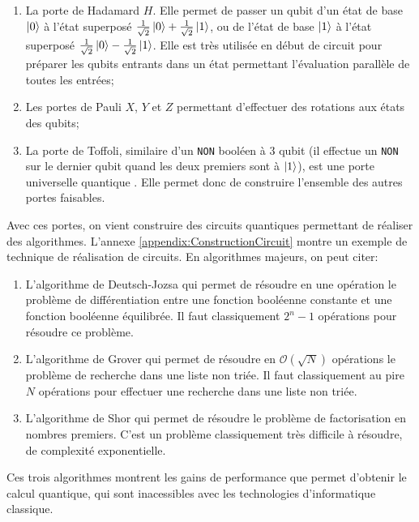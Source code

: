 \begin{enumerate}
    \item La porte de Hadamard $H$. Elle permet de passer un qubit d'un état de base $\ket{0}$ à l'état superposé $\frac{1}{\sqrt{2}}\ket{0} + \frac{1}{\sqrt{2}}\ket{1}$, ou de l'état de base $\ket{1}$ à l'état superposé $\frac{1}{\sqrt{2}}\ket{0} - \frac{1}{\sqrt{2}}\ket{1}$. Elle est très utilisée en début de circuit pour préparer les qubits entrants dans un état permettant l'évaluation parallèle de toutes les entrées;
    \item Les portes de Pauli $X$, $Y$ et $Z$ permettant d'effectuer des rotations aux états des qubits;
    \item La porte de Toffoli, similaire d'un \texttt{NON} booléen à 3 qubit (il effectue un \texttt{NON} sur le dernier qubit quand les deux premiers sont à $\ket{1}$), est une porte universelle quantique \cite{shi2002toffoli}. Elle permet donc de construire l'ensemble des autres portes faisables.
\end{enumerate}

Avec ces portes, on vient construire des circuits quantiques permettant de réaliser des algorithmes. L'annexe \ref{appendix:ConstructionCircuit} montre un exemple de technique de réalisation de circuits. En algorithmes majeurs, on peut citer:

\begin{enumerate}
    \item L'algorithme de Deutsch-Jozsa \cite{Deutsch92} qui permet de résoudre en une opération le problème de différentiation entre une fonction booléenne constante et une fonction booléenne équilibrée. Il faut classiquement $2^n -1$ opérations pour résoudre ce problème.
    \item L'algorithme de Grover \cite{Grover96} qui permet de résoudre en $\mathcal{O}(\sqrt{N})$ opérations le problème de recherche dans une liste non triée. Il faut classiquement au pire $N$ opérations pour effectuer une recherche dans une liste non triée.
    \item L'algorithme de Shor \cite{Shor97} qui permet de résoudre le problème de factorisation en nombres premiers. C'est un problème classiquement très difficile à résoudre, de complexité exponentielle.
\end{enumerate}

Ces trois algorithmes montrent les gains de performance que permet d'obtenir le calcul quantique, qui sont inacessibles avec les technologies d'informatique classique.